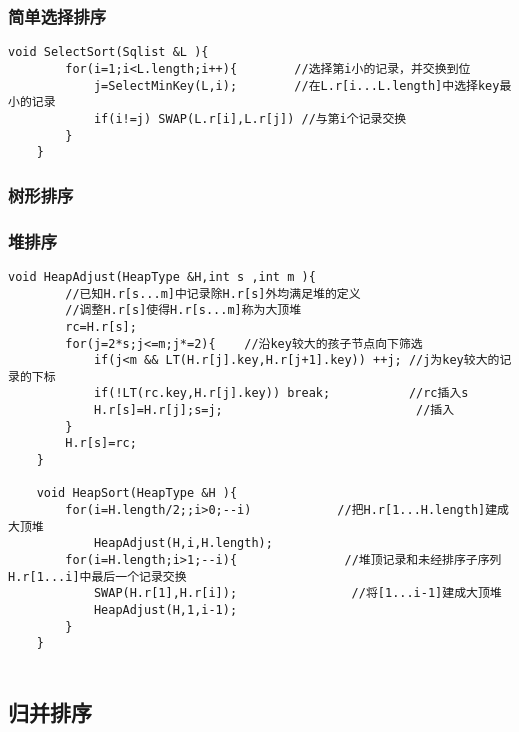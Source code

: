 \documentclass[UTF8]{ctexart}
\begin{document}
\subsubsection{简单选择排序}

\begin{lstlisting}[style=v1]
    void SelectSort(Sqlist &L ){
        for(i=1;i<L.length;i++){        //选择第i小的记录，并交换到位
            j=SelectMinKey(L,i);        //在L.r[i...L.length]中选择key最小的记录
            if(i!=j) SWAP(L.r[i],L.r[j]) //与第i个记录交换
        }
    }
\end{lstlisting}
\subsubsection{树形排序}

\subsubsection{堆排序}


\begin{lstlisting}[style=v1]
    void HeapAdjust(HeapType &H,int s ,int m ){
        //已知H.r[s...m]中记录除H.r[s]外均满足堆的定义
        //调整H.r[s]使得H.r[s...m]称为大顶堆
        rc=H.r[s];
        for(j=2*s;j<=m;j*=2){    //沿key较大的孩子节点向下筛选
            if(j<m && LT(H.r[j].key,H.r[j+1].key)) ++j; //j为key较大的记录的下标
            if(!LT(rc.key,H.r[j].key)) break;           //rc插入s    
            H.r[s]=H.r[j];s=j;                           //插入   
        }
        H.r[s]=rc;
    }
 
    void HeapSort(HeapType &H ){
        for(i=H.length/2;;i>0;--i)            //把H.r[1...H.length]建成大顶堆          
            HeapAdjust(H,i,H.length);           
        for(i=H.length;i>1;--i){               //堆顶记录和未经排序子序列H.r[1...i]中最后一个记录交换 
            SWAP(H.r[1],H.r[i]);                //将[1...i-1]建成大顶堆
            HeapAdjust(H,1,i-1); 
        }
    }
 
\end{lstlisting}





\subsection{归并排序}
\end{document}
